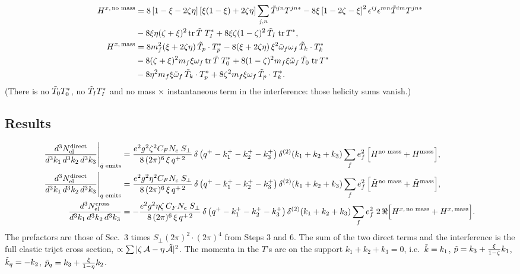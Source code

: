 \documentclass[9pt]{article}
\numberwithin{equation}{section}
\begin{document}
\begin{align}\label{eq:Hx}
H^{x,\,\text{no mass}} & = 8\left[1-\xi-2\zeta\eta\right]\left[\xi(1-\xi)+2\zeta\eta\right]\sum_{j,n}\Tilde{T}^{jn}T^{jn*}-8\xi\left[1-2\zeta-\xi\right]^{2}\epsilon^{ij}\epsilon^{mn}\Tilde{T}^{im}T^{jn*}\notag \\ & -8\xi\eta(\zeta+\xi)^{2}\,\mathrm{tr}\,\Tilde{T}\;T^{*}_{I}+8\xi\zeta(1-\zeta)^{2}\,\Tilde{T}_{I}\;\mathrm{tr}\,T^{*},\notag \\
H^{x,\,\text{mass}} & = 8m^{2}_{f}(\xi+2\zeta\eta)\,\Tilde{T}_{p}\cdot T^{*}_{p}-8(\xi+2\zeta\eta)\,\xi^{2}\Tilde{\omega}_{f}\omega_{f}\,\Tilde{T}_{k}\cdot T^{*}_{k}\notag \\ & -8(\zeta+\xi)^{2}m_{f}\xi\omega_{f}\,\mathrm{tr}\,\Tilde{T}\;T^{*}_{0}+8(1-\zeta)^{2}m_{f}\xi\Tilde{\omega}_{f}\,\Tilde{T}_{0}\;\mathrm{tr}\,T^{*}\notag \\
& -8\eta^{2}m_{f}\xi\Tilde{\omega}_{f}\,\Tilde{T}_{k}\cdot T^{*}_{p}+8\zeta^{2}m_{f}\xi\omega_{f}\,\Tilde{T}_{p}\cdot T^{*}_{k}.
\end{align}
(There is no $\Tilde{T}_{0}T^{*}_{0}$, no $\Tilde{T}_{I}T^{*}_{I}$ and no mass $\times$ instantaneous term in the interference: those helicity sums vanish.)

\subsection{Results}
\begin{align}\label{eq:resel}
\frac{d^{3}N^{\text{direct}}_{\text{el}}}{d^{3}k_{1}\,d^{3}k_{2}\,d^{3}k_{3}}\Bigg|_{\Bar{q}\text{ emits}} & = \frac{e^{2}g^{2}\zeta^{2}C_{F}N_{c}\;S_{\perp}}{8\,(2\pi)^{6}\,\xi\,q^{+\,2}}\,\delta\left(q^{+}-k^{+}_{1}-k^{+}_{2}-k^{+}_{3}\right)\delta^{(2)}(k_{1}+k_{2}+k_{3})\sum_{f}e^{2}_{f}\,\Big[H^{\text{no mass}}+H^{\text{mass}}\Big],\notag \\
\frac{d^{3}N^{\text{direct}}_{\text{el}}}{d^{3}k_{1}\,d^{3}k_{2}\,d^{3}k_{3}}\Bigg|_{q\text{ emits}} & = \frac{e^{2}g^{2}\eta^{2}C_{F}N_{c}\;S_{\perp}}{8\,(2\pi)^{6}\,\xi\,q^{+\,2}}\,\delta\left(q^{+}-k^{+}_{1}-k^{+}_{2}-k^{+}_{3}\right)\delta^{(2)}(k_{1}+k_{2}+k_{3})\sum_{f}e^{2}_{f}\,\Big[\Tilde{H}^{\text{no mass}}+\Tilde{H}^{\text{mass}}\Big],\notag \\
\frac{d^{3}N^{\text{cross}}_{\text{el}}}{d^{3}k_{1}\,d^{3}k_{2}\,d^{3}k_{3}} & = -\frac{e^{2}g^{2}\eta\zeta\,C_{F}N_{c}\;S_{\perp}}{8\,(2\pi)^{6}\,\xi\,q^{+\,2}}\,\delta\left(q^{+}-k^{+}_{1}-k^{+}_{2}-k^{+}_{3}\right)\delta^{(2)}(k_{1}+k_{2}+k_{3})\sum_{f}e^{2}_{f}\;2\,\Re\Big[H^{x,\,\text{no mass}}+H^{x,\,\text{mass}}\Big].
\end{align}
The prefactors are those of Sec.~3 times $S_{\perp}(2\pi)^{2}\cdot(2\pi)^{4}$ from Steps 3 and 6. The sum of the two direct terms and the interference is the full elastic trijet cross section, $\propto\sum|\zeta\,\mathcal{A}-\eta\,\Tilde{\mathcal{A}}|^{2}$. The momenta in the $T$'s are on the support $k_{1}+k_{2}+k_{3}=0$, i.e.\ $\Tilde{k}=k_{1}$, $\Tilde{p}=k_{3}+\frac{\xi}{1-\zeta}k_{1}$, $\Tilde{k}_{q}=-k_{2}$, $\Tilde{p}_{q}=k_{3}+\frac{\xi}{1-\eta}k_{2}$.
\end{document}
